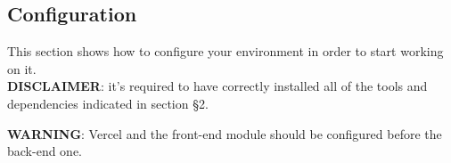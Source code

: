 \subsection{Configuration}
This section shows how to configure your environment in order to start working on it.\\
\textbf{DISCLAIMER}: it's required to have correctly installed all of the tools and dependencies indicated in section §2.

\textbf{WARNING}: Vercel and the front-end module should be configured before the back-end one.






